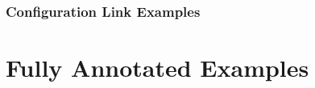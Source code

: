 \documentclass[11pt]{article}
\begin{document}

\subsubsection{Configuration Link Examples} %
\label{ssub:configuration_link_examples}



\section{Fully Annotated Examples} %
\label{sec:fully_annotated_examples}


\end{document}
